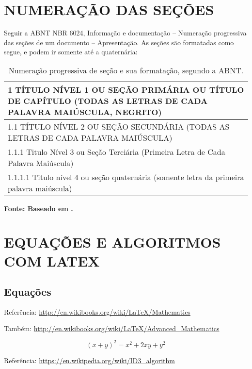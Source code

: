 \section{NUMERAÇÃO DAS SEÇÕES}\label{sec:NUMERAÇÃO}
Seguir a ABNT NBR 6024, Informação e documentação – Numeração progressiva das seções de um documento – Apresentação. As seções são formatadas como segue, e podem ir somente até a quaternária:

\begin{table}
	\caption{Numeração progressiva de seção e sua formatação, segundo a ABNT.}
	\label{tab:numeracaosecao}
	\begin{tabular}{|p{14.7cm}|} 
		\hline
		\textbf{\large 1 TÍTULO NÍVEL 1 OU SEÇÃO PRIMÁRIA OU TÍTULO DE CAPÍTULO (TODAS AS LETRAS DE CADA PALAVRA MAIÚSCULA, NEGRITO)}  \\ 
		\hline
		1.1 TÍTULO NÍVEL 2 OU SEÇÃO SECUNDÁRIA (TODAS AS LETRAS DE CADA PALAVRA MAIÚSCULA)~ ~                                   \\ 
		\hline
		1.1.1 Titulo Nível 3 ou Seção Terciária (Primeira Letra de Cada Palavra Maiúscula)~ ~                                   \\ 
		\hline
		1.1.1.1 Titulo nível 4 ou seção quaternária (somente letra da primeira palavra maiúscula)~ ~ ~ ~ ~ ~ ~~                 \\
		\hline
	\end{tabular}
	\newline \footnotesize \textbf{Fonte: Baseado em \cite{Nbr2012}.} 
\end{table}

\section{EQUAÇÕES E ALGORITMOS COM LATEX}\label{sec:LATEX}

\subsection{Equações}\label{sec:Equacoes}
Referência: \url{http://en.wikibooks.org/wiki/LaTeX/Mathematics}

Também: \url{http://en.wikibooks.org/wiki/LaTeX/Advanced_Mathematics}

\begin{equation}
(x + y)^2 = x^2 + 2xy + y^2
\label{eq:Teorema1}
\end{equation}

Referência: \url{https://en.wikipedia.org/wiki/ID3_algorithm}

